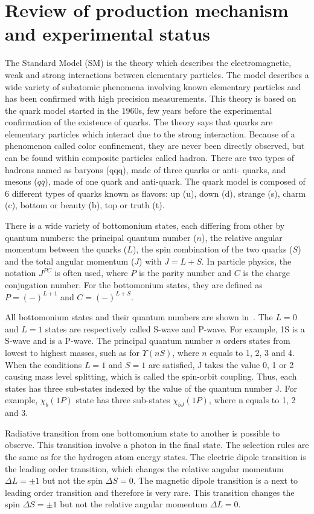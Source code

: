\chapter{Review of production mechanism and experimental status}

The Standard Model (SM) is the theory which describes the electromagnetic,
weak and strong interactions between elementary particles. The model describes
a wide variety of subatomic phenomena involving known elementary particles and
has been confirmed with high precision measurements. This theory is based on
the quark model started in the 1960s\cite{GellMann:1964nj,Zweig:1981pd}, few
years before the experimental confirmation of the existence of quarks. The
theory says that quarks are elementary particles which interact due to the
strong interaction. Because of a phenomenon called color confinement, they are
never been directly observed,  but can be found within composite particles
called hadron. There are two types of hadrons named as baryons (qqq), made of
three quarks or anti- quarks, and mesons ($q\bar{q}$), made of one quark and
anti-quark. The quark model is composed of 6 different types of quarks known as
flavors: up (u), down (d), strange (s), charm (c), bottom or beauty (b), top or
truth (t). 


There is a wide variety of bottomonium states, each differing from other by quantum
numbers: the principal quantum number ($n$), the relative angular momentum
between the quarks ($L$), the spin combination of the two quarks ($S$) and the total
angular momentum ($J$) with $J = L + S$. In particle physics, the notation $J^{PC}$ is
often used, where $P$ is the parity number and $C$ is the charge conjugation number.
For the bottomonium states, they are defined as $P=(-)^{L+1}$ and $C=(-)^{L+S}$.




All bottomonium states and their quantum numbers are shown
in~. The $L = 0$ and $L = 1$ states are respectively
called S-wave and P-wave. For example, \Y1S is a S-wave and \chiboneOneP is a
P-wave. The principal quantum number $n$ orders states from lowest to highest
masses, such as for $\Upsilon(nS)$, where $n$ equals to 1, 2, 3 and 4. When the
conditions $L = 1$ and $S = 1$ are satisfied, J takes the value 0, 1 or 2
causing mass level splitting, which is called the spin-orbit coupling. Thus,
each \chib states has three sub-states indexed by the value of the quantum
number J. For example, $\chi_b(1P)$ state has three sub-states $\chi_{bJ}(1P)$,
where n equals to 1, 2 and 3.

Radiative transition from one bottomonium state to another is possible to
observe. This transition involve a photon in the final state. The selection
rules are the same as for the hydrogen atom energy states. The electric dipole
transition is the leading order transition, which changes the relative angular
momentum $\Delta L  = \pm 1$ but not the spin $\Delta S = 0$. The magnetic
dipole transition is a next to leading order transition and therefore is very
rare. This transition changes the spin $\Delta S = \pm 1$ but not the relative
angular momentum $\Delta L = 0$.